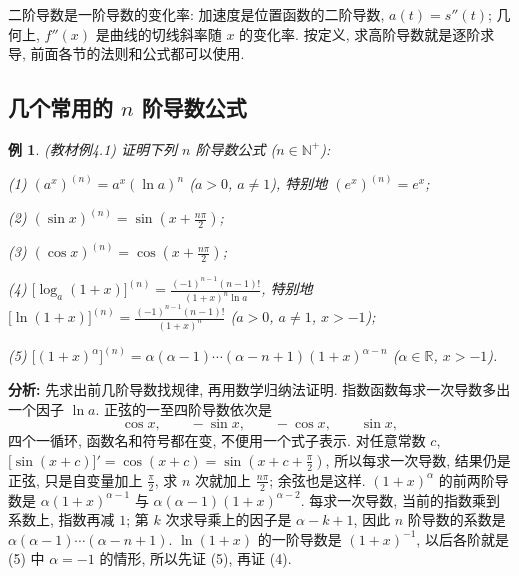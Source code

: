 \documentclass[UTF8,openany]{ctexbook}
\theoremstyle{chinesetextbook}
\newtheorem{example}{例}[section]
\begin{document}
二阶导数是一阶导数的变化率: 加速度是位置函数的二阶导数, $a(t)=s''(t)$; 几何上, $f''(x)$ 是曲线的切线斜率随 $x$ 的变化率. 按定义, 求高阶导数就是逐阶求导, 前面各节的法则和公式都可以使用.
\subsection{\texorpdfstring{几个常用的 $n$ 阶导数公式}{几个常用的 n 阶导数公式}}
\begin{example}\label{ex:c2-4-1}
\textnormal{(教材例4.1)} 证明下列 $n$ 阶导数公式 ($n\in\mathbb N^+$):

(1) $(a^x)^{(n)}=a^x(\ln a)^n$ ($a>0$, $a\ne1$), 特别地 $(e^x)^{(n)}=e^x$;

(2) $\displaystyle(\sin x)^{(n)}=\sin\left(x+\frac{n\pi}2\right)$;

(3) $\displaystyle(\cos x)^{(n)}=\cos\left(x+\frac{n\pi}2\right)$;

(4) $\displaystyle\bigl[\log_a(1+x)\bigr]^{(n)}=\frac{(-1)^{n-1}(n-1)!}{(1+x)^n\ln a}$, 特别地 $\displaystyle\bigl[\ln(1+x)\bigr]^{(n)}=\frac{(-1)^{n-1}(n-1)!}{(1+x)^n}$ ($a>0$, $a\ne1$, $x>-1$);

(5) $\bigl[(1+x)^\alpha\bigr]^{(n)}=\alpha(\alpha-1)\cdots(\alpha-n+1)(1+x)^{\alpha-n}$ ($\alpha\in\mathbb R$, $x>-1$).
\end{example}
\par\indent\textbf{分析:} 先求出前几阶导数找规律, 再用数学归纳法证明. 指数函数每求一次导数多出一个因子 $\ln a$. 正弦的一至四阶导数依次是
\[
\cos x,\qquad-\sin x,\qquad-\cos x,\qquad\sin x,
\]
四个一循环, 函数名和符号都在变, 不便用一个式子表示. 对任意常数 $c$, $\displaystyle\bigl[\sin(x+c)\bigr]'=\cos(x+c)=\sin\left(x+c+\frac\pi2\right)$, 所以每求一次导数, 结果仍是正弦, 只是自变量加上 $\displaystyle\frac\pi2$, 求 $n$ 次就加上 $\displaystyle\frac{n\pi}2$; 余弦也是这样. $(1+x)^\alpha$ 的前两阶导数是 $\alpha(1+x)^{\alpha-1}$ 与 $\alpha(\alpha-1)(1+x)^{\alpha-2}$. 每求一次导数, 当前的指数乘到系数上, 指数再减 $1$; 第 $k$ 次求导乘上的因子是 $\alpha-k+1$, 因此 $n$ 阶导数的系数是 $\alpha(\alpha-1)\cdots(\alpha-n+1)$. $\ln(1+x)$ 的一阶导数是 $(1+x)^{-1}$, 以后各阶就是 (5) 中 $\alpha=-1$ 的情形, 所以先证 (5), 再证 (4).
\end{document}
